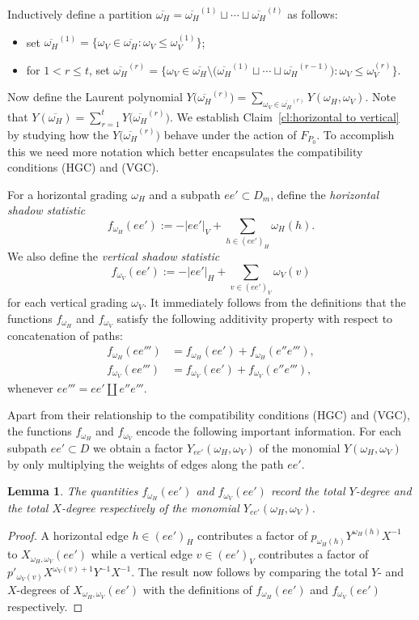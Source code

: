 \documentclass{amsart}
\newtheorem{lemma}[theorem]{Lemma}
\begin{document}
Inductively define a partition $\overline{\omega_H}=\overline{\omega_H}^{(1)}\sqcup\cdots\sqcup\overline{\omega_H}^{(t)}$ as follows:
\begin{itemize}
 \item set $\overline{\omega_H}^{(1)}=\big\{\omega_V\in\overline{\omega_H}:\omega_V\le\omega_V^{(1)}\big\}$;
 \item for $1<r\le t$, set $\overline{\omega_H}^{(r)}=\Big\{\omega_V\in\overline{\omega_H}\setminus\big(\overline{\omega_H}^{(1)}\sqcup\cdots\sqcup\overline{\omega_H}^{(r-1)}\big):\omega_V\le\omega_V^{(r)}\Big\}$.
\end{itemize}
Now define the Laurent polynomial $Y\big(\overline{\omega_H}^{(r)}\big)=\sum\limits_{\omega_V\in\overline{\omega_H}^{(r)}} Y(\omega_H,\omega_V)$.  Note that $Y(\overline{\omega_H})=\sum\limits_{r=1}^t  Y\big(\overline{\omega_H}^{(r)}\big)$.  We establish Claim~\ref{cl:horizontal to vertical} by studying how the $Y\big(\overline{\omega_H}^{(r)}\big)$ behave under the action of $F_{P_0}$.  To accomplish this we need more notation which better encapsulates the compatibility conditions (HGC) and (VGC).

For a horizontal grading $\omega_H$ and a subpath $ee'\subset D_m$, define the \emph{horizontal shadow statistic}
\[f_{\omega_H}(ee'):=-|ee'|_V+\sum\limits_{h\in(ee')_H}\omega_H(h).\]
We also define the \emph{vertical shadow statistic}
\[f_{\omega_V}(ee'):=-|ee'|_H+\sum\limits_{v\in(ee')_V}\omega_V(v)\]
for each vertical grading $\omega_V$.  It immediately follows from the definitions that the functions $f_{\omega_H}$ and $f_{\omega_V}$ satisfy the following additivity property with respect to concatenation of paths:
\begin{align*}
  f_{\omega_H}(ee''')&=f_{\omega_H}(ee')+f_{\omega_H}(e''e'''),\\
  f_{\omega_V}(ee''')&=f_{\omega_V}(ee')+f_{\omega_V}(e''e'''),
\end{align*}
whenever $ee'''=ee'\amalg e''e'''$.

Apart from their relationship to the compatibility conditions (HGC) and (VGC), the functions $f_{\omega_H}$ and $f_{\omega_V}$ encode the following important information.  For each subpath $ee'\subset D$ we obtain a factor $Y_{ee'}(\omega_H,\omega_V)$ of the monomial $Y(\omega_H,\omega_V)$ by only multiplying the weights of edges along the path $ee'$.
\begin{lemma}
  The quantities $f_{\omega_H}(ee')$ and $f_{\omega_V}(ee')$ record the total $Y$-degree and the total $X$-degree respectively of the monomial $Y_{ee'}(\omega_H,\omega_V)$.
\end{lemma}
\begin{proof}
  A horizontal edge $h\in(ee')_H$ contributes a factor of $p_{\omega_H(h)}Y^{\omega_H(h)}X^{-1}$ to $X_{\omega_H,\omega_V}(ee')$ while a vertical edge $v\in(ee')_V$ contributes a factor of $p'_{\omega_V(v)}X^{\omega_V(v)+1}Y^{-1}X^{-1}$.  The result now follows by comparing the total $Y$- and $X$-degrees of $X_{\omega_H,\omega_V}(ee')$ with the definitions of $f_{\omega_H}(ee')$ and $f_{\omega_V}(ee')$ respectively.
\end{proof}
\end{document}
